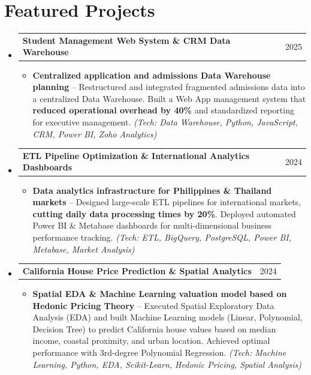 \documentclass[letterpaper,11pt]{article}
\makeatletter
\newcommand{\resumeItem}[1]{
  \item\small{
    {#1 \vspace{1pt}}
  }
}
\newcommand{\resumeProjectHeading}[2]{
    \vspace{2pt}\item
    \begin{tabular*}{\textwidth}{l@{\extracolsep{\fill}}r}
      \small#1 & #2 \\
    \end{tabular*}\vspace{-2pt}
}
\newcommand{\resumeSubHeadingListStart}{\begin{itemize}[leftmargin=0.15in, label={}]}
\newcommand{\resumeSubHeadingListEnd}{\end{itemize}}
\newcommand{\resumeItemListStart}{\begin{itemize}[leftmargin=0.15in, itemsep=2.5pt, topsep=2pt, parsep=1.5pt]}
\newcommand{\resumeItemListEnd}{\end{itemize}\vspace{2pt}}
\makeatother
\begin{document}
\section*{Featured Projects}
  \resumeSubHeadingListStart
        \resumeProjectHeading
      {\textbf{Student Management Web System \& CRM Data Warehouse}}{2025}
      \resumeItemListStart
        \resumeItem{\textbf{Centralized application and admissions Data Warehouse planning} -- Restructured and integrated fragmented admissions data into a centralized Data Warehouse. Built a Web App management system that \textbf{reduced operational overhead by 40\%} and standardized reporting for executive management. \emph{(Tech: Data Warehouse, Python, JavaScript, CRM, Power BI, Zoho Analytics)}}
      \resumeItemListEnd
    \resumeProjectHeading
      {\textbf{ETL Pipeline Optimization \& International Analytics Dashboards}}{2024}
      \resumeItemListStart
        \resumeItem{\textbf{Data analytics infrastructure for Philippines \& Thailand markets} -- Designed large-scale ETL pipelines for international markets, \textbf{cutting daily data processing times by 20\%}. Deployed automated Power BI \& Metabase dashboards for multi-dimensional business performance tracking. \emph{(Tech: ETL, BigQuery, PostgreSQL, Power BI, Metabase, Market Analysis)}}
      \resumeItemListEnd
    \resumeProjectHeading
      {\textbf{California House Price Prediction \& Spatial Analytics}}{2024}
      \resumeItemListStart
        \resumeItem{\textbf{Spatial EDA \& Machine Learning valuation model based on Hedonic Pricing Theory} -- Executed Spatial Exploratory Data Analysis (EDA) and built Machine Learning models (Linear, Polynomial, Decision Tree) to predict California house values based on median income, coastal proximity, and urban location. Achieved optimal performance with 3rd-degree Polynomial Regression. \emph{(Tech: Machine Learning, Python, EDA, Scikit-Learn, Hedonic Pricing, Spatial Analysis)}}
      \resumeItemListEnd
  \resumeSubHeadingListEnd

\end{document}
